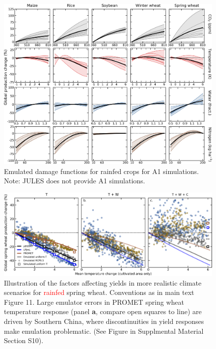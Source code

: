 \documentclass[10pt]{article}
\begin{document}
{{\begin{figure}[h!]
  \centering
  \includegraphics[width = 16.3cm]{em_CTWN_all_crops_A1.png}
  \caption{
  Emulated damage functions for rainfed crops for A1 simulations. Note: JULES does not provide A1 simulations.
  }
  \label{fig:all_dims}
\end{figure}

\clearpage

\begin{figure}[h!]
  \centering
  \includegraphics[width = 16.3cm]{LPJmL_pDSSAT_PROMET_RCP85_all_cases_spring_wheat.png}
  \caption{
	  Illustration of the factors affecting yields in more realistic climate scenarios for \textcolor{red}{rainfed} spring wheat. Conventions as in  main text Figure 11. Large emulator errors in PROMET spring wheat temperature response (panel \textbf{a}, compare open squares to line) are driven by Southern China, where discontinuities in yield responses make emulation problematic. (See Figure in Supplmental Material Section S10).
	  }
\end{figure}

}}
\end{document}

